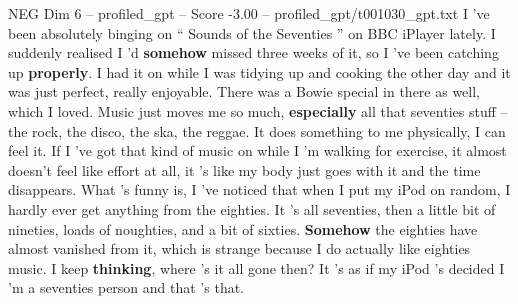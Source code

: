 \begin{textsample}{NEG Dim 6 – profiled\_gpt – Score -3.00 – profiled\_gpt/t001030\_gpt.txt}  \label{ex:f6_neg_008}
I ’ve been absolutely binging on “ Sounds of the Seventies ” on BBC iPlayer lately.
I suddenly realised I ’d \textbf{somehow} missed three weeks of it, so I ’ve been catching up \textbf{properly}.
I had it on while I was tidying up and cooking the other day and it was just perfect, really enjoyable.
There was a Bowie special in there as well, which I loved.
Music just moves me so much, \textbf{especially} all that seventies stuff – the rock, the disco, the ska, the reggae.
It does something to me physically, I can feel it.
If I ’ve got that kind of music on while I ’m walking for exercise, it almost doesn't feel like effort at all, it ’s like my body just goes with it and the time disappears.
What ’s funny is, I ’ve noticed that when I put my iPod on random, I hardly ever get anything from the eighties.
It ’s all seventies, then a little bit of nineties, loads of noughties, and a bit of sixties. \textbf{Somehow} the eighties have almost vanished from it, which is strange because I do actually like eighties music.
I keep \textbf{thinking}, where ’s it all gone then?
It ’s as if my iPod ’s decided I ’m a seventies person and that ’s that.

\end{textsample}
